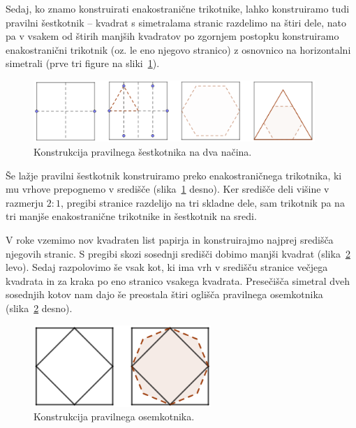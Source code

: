 Sedaj, ko znamo konstruirati enakostranične trikotnike, lahko konstruiramo tudi pravilni šestkotnik -- kvadrat s simetralama stranic razdelimo na štiri dele, nato pa v vsakem od štirih manjših kvadratov po zgornjem postopku konstruiramo enakostranični trikotnik (oz. le eno njegovo stranico) z osnovnico na horizontalni simetrali (prve tri figure na sliki~\ref{fig:6kotnik_basic}).

\begin{figure}[h]
    \centering
    \includegraphics[width=0.95\textwidth]{images/n-kotniki/6kotnik_basic.png}
    \caption[Konstrukcija pravilnega šestkotnika (način $1$) in $2$]{Konstrukcija pravilnega šestkotnika na dva načina.}
    \label{fig:6kotnik_basic}
\end{figure}

Še lažje pravilni šestkotnik konstruiramo preko enakostraničnega trikotnika, ki mu vrhove prepognemo v središče (slika~\ref{fig:6kotnik_basic} desno). Ker središče deli višine v razmerju $2:1$, pregibi stranice razdelijo na tri skladne dele, sam trikotnik pa na tri manjše enakostranične trikotnike in šestkotnik na sredi.

V roke vzemimo nov kvadraten list papirja in konstruirajmo najprej središča njegovih stranic. S pregibi skozi sosednji središči dobimo manjši kvadrat (slika~\ref{fig:8kotnik_basic} levo). Sedaj razpolovimo še vsak kot, ki ima vrh v središču stranice večjega kvadrata in za kraka po eno stranico vsakega kvadrata. Presečišča simetral dveh sosednjih kotov nam dajo še preostala štiri oglišča pravilnega osemkotnika (slika~\ref{fig:8kotnik_basic} desno).

\begin{figure}[h]
    \centering
    \includegraphics[width=0.6\textwidth]{images/n-kotniki/8kotnik_basic.png}
    \caption[Konstrukcija pravilnega osemkotnika]{Konstrukcija pravilnega osemkotnika.}
    \label{fig:8kotnik_basic}
\end{figure}

